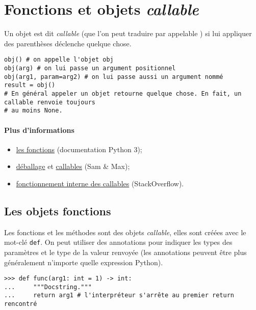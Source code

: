 \section{Fonctions et objets {\normalfont\bfseries\itshape callable}}\label{sec:callable}
Un objet est dit \textit{callable} (que l'on peut traduire par \og appelable \fg{}) si lui appliquer des parenthèses déclenche quelque chose.

\begin{verbatim}
obj() # on appelle l'objet obj
obj(arg) # on lui passe un argument positionnel
obj(arg1, param=arg2) # on lui passe aussi un argument nommé
result = obj() 
# En général appeler un objet retourne quelque chose. En fait, un callable renvoie toujours
# au moins None.
\end{verbatim}

\paragraph*{Plus d'informations}
\begin{itemize}
    \item \href{https://docs.python.org/3/reference/datamodel.html\#index-32}{les fonctions} (documentation Python 3);
    \item \href{http://sametmax.com/quest-ce-que-lunpacking-en-python-et-a-quoi-ca-sert/}{déballage} et \href{http://sametmax.com/quest-ce-quun-callable-en-python/}{callables} (Sam \& Max);
    \item \href{https://stackoverflow.com/a/32856533/9214306}{fonctionnement interne des callables} (StackOverflow).
\end{itemize}

\subsection{Les objets fonctions}

Les fonctions et les méthodes sont des objets \textit{callable}, elles sont créées avec le mot-clé \texttt{def}. On peut utiliser des annotations pour indiquer les types des paramètres et le type de la valeur renvoyée (les annotations peuvent être plus généralement n'importe quelle expression Python).

\begin{verbatim}
>>> def func(arg1: int = 1) -> int:
...     """Docstring."""
...     return arg1 # l'interpréteur s'arrête au premier return rencontré
\end{verbatim}

